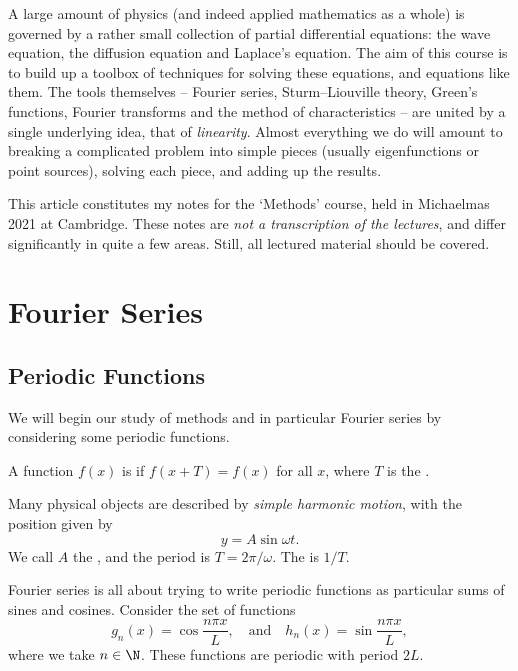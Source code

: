 



A large amount of physics (and indeed applied mathematics as a whole) is governed by a rather small collection of partial differential equations: the wave equation, the diffusion equation and Laplace's equation. The aim of this course is to build up a toolbox of techniques for solving these equations, and equations like them.
The tools themselves -- Fourier series, Sturm--Liouville theory, Green's functions, Fourier transforms and the method of characteristics -- are united by a single underlying idea, that of \emph{linearity}. Almost everything we do will amount to breaking a complicated problem into simple pieces (usually eigenfunctions or point sources), solving each piece, and adding up the results.

This article constitutes my notes for the `Methods' course, held in Michaelmas 2021 at Cambridge. These notes are \emph{not a transcription of the lectures}, and differ significantly in quite a few areas. Still, all lectured material should be covered.



\section{Fourier Series}

\subsection{Periodic Functions}

We will begin our study of methods and in particular Fourier series by considering some periodic functions.

\begin{definition}[Periodic]
    A function $f(x)$ is  if $f(x + T) = f(x)$ for all $x$, where $T$ is the .
\end{definition}

\begin{example}
    Many physical objects are described by \emph{simple harmonic motion}, with the position given by
    $$
    y = A \sin \omega t.
    $$
    We call $A$ the , and the period is $T = 2 \pi / \omega$. The  is $1/T$.
\end{example}

Fourier series is all about trying to write periodic functions as particular sums of sines and cosines.
Consider the set of functions
$$
g_n(x) = \cos \frac{n \pi x}{L}, \quad \text{and} \quad h_n(x) = \sin \frac{n \pi x}{L},
$$
where we take $n \in \N$.  These functions are periodic with period $2L$.

